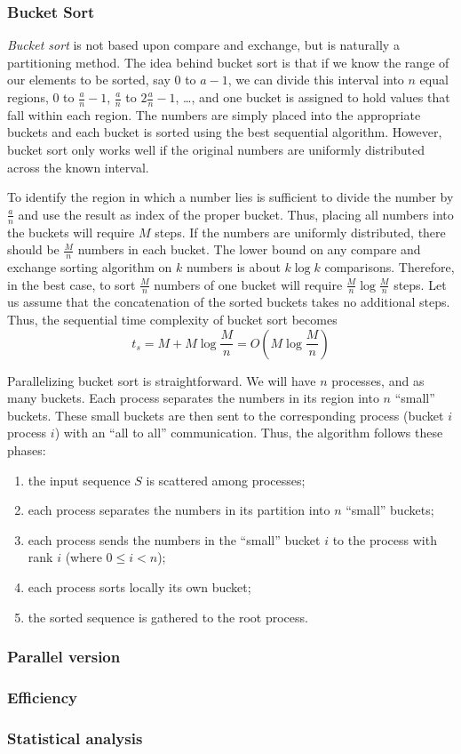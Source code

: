 \subsubsection{Bucket Sort}
\textit{Bucket sort} is not based upon compare and exchange, but is naturally a partitioning method. The idea behind bucket sort is that if we know the range of our elements to be sorted, say $0$ to $a-1$, we can divide this interval into $n$ equal regions, $0$ to $\frac{a}{n}-1$, $\frac{a}{n}$ to $2\frac{a}{n}-1$, \dots , and one bucket is assigned to hold values that fall within each region. The numbers are simply placed into the appropriate buckets and each bucket is sorted using the best sequential algorithm. However, bucket sort only works well if the original numbers are uniformly distributed across the known interval. 

To identify the region in which a number lies is sufficient to divide the number by $\frac{a}{n}$ and use the result as index of the proper bucket. Thus, placing all numbers into the buckets will require $M$ steps. If the numbers are uniformly distributed, there should be $\frac{M}{n}$ numbers in each bucket. The lower bound on any compare and exchange sorting algorithm on $k$ numbers is about $k \log k$ comparisons. Therefore, in the best case, to sort $\frac{M}{n}$ numbers of one bucket will require $\frac{M}{n} \log \frac{M}{n}$ steps. Let us assume that the concatenation of the sorted buckets takes no additional steps. Thus, the sequential time complexity of bucket sort becomes
\[
t_s = M + M \log \frac{M}{n} = O( M \log \frac{M}{n} )
\]

Parallelizing bucket sort is straightforward. We will have $n$ processes, and as many buckets. Each process separates the numbers in its region into $n$ ``small'' buckets. These small buckets are then sent to the corresponding process (bucket $i$ process $i$) with an ``all to all'' communication. Thus, the algorithm follows these phases:
\begin{enumerate}	
	\item the input sequence $S$ is scattered among processes;
	\item each process separates the numbers in its partition into $n$ ``small'' buckets;
	\item each process sends the numbers in the ``small'' bucket $i$ to the process with rank $i$ (where $0 \leq i < n$);
	\item each process sorts locally its own bucket;
	\item the sorted sequence is gathered to the root process.
\end{enumerate}

 
\subsubsection*{Parallel version} 
\subsubsection*{Efficiency} 
\subsubsection*{Statistical analysis}